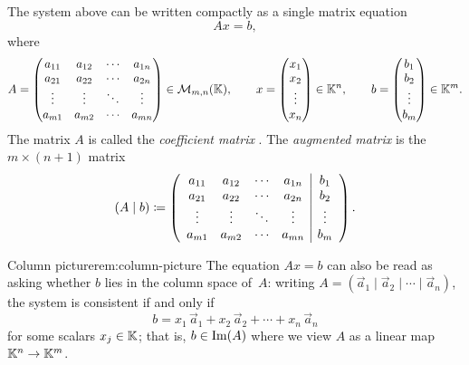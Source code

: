 The system above can be written compactly as a single matrix equation
\begin{equation}\label{eq:Axb}
  Ax = b,
\end{equation}
where
\[
  A = \begin{pmatrix}
    a_{11} & a_{12} & \cdots & a_{1n}\\
    a_{21} & a_{22} & \cdots & a_{2n}\\
    \vdots & \vdots & \ddots & \vdots\\
    a_{m1} & a_{m2} & \cdots & a_{mn}
  \end{pmatrix}
  \in \mathcal{M}_{m,n}({\mathbb{K}}),
  \qquad
  x = \begin{pmatrix} x_1\\ x_2\\ \vdots\\ x_n \end{pmatrix}
  \in {\mathbb{K}}^n,
  \qquad
  b = \begin{pmatrix} b_1\\ b_2\\ \vdots\\ b_m \end{pmatrix}
  \in {\mathbb{K}}^m.
\]
The matrix $A$ is called the \emph{coefficient matrix}%
. The \emph{augmented matrix}%
 is the $m\times(n+1)$ matrix
\begin{equation}\label{eq:augmented}
  (A \mid b) \coloneqq
  \left(\begin{array}{cccc|c}
    a_{11} & a_{12} & \cdots & a_{1n} & b_1\\
    a_{21} & a_{22} & \cdots & a_{2n} & b_2\\
    \vdots & \vdots & \ddots & \vdots & \vdots\\
    a_{m1} & a_{m2} & \cdots & a_{mn} & b_m
  \end{array}\right).
\end{equation}

\begin{remark}{Column picture}{rem:column-picture}
The equation $Ax = b$ can also be read as asking whether $b$ lies in
the column space of~$A$: writing $A = (\vec{a}_1 \mid \vec{a}_2 \mid
\cdots \mid \vec{a}_n)$, the system is consistent if and only if
\[
  b = x_1\,\vec{a}_1 + x_2\,\vec{a}_2 + \cdots + x_n\,\vec{a}_n
\]
for some scalars $x_j\in{\mathbb{K}}$; that is, $b\in\operatorname{Im}(A)$ where we view $A$
as a linear map ${\mathbb{K}}^n\to{\mathbb{K}}^m$.
\end{remark}


